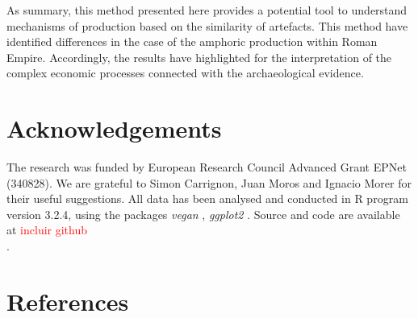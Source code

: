 \documentclass[review]{elsarticle}
\newcommand{\memo}[2]{\textcolor{#1}{#2}}
\newcommand{\maria}[1]{\memo{red}{#1\\}}
\begin{document}
As summary, this method presented here provides a potential tool to understand mechanisms of production based on the similarity of artefacts. This method have identified differences in the case of the amphoric production within Roman Empire. Accordingly, the results have highlighted for the interpretation of the complex economic processes connected with the archaeological evidence. 



\section{Acknowledgements}
The research was funded by European Research Council Advanced Grant EPNet (340828). We are grateful to Simon Carrignon, Juan Moros and Ignacio Morer for their useful suggestions.  
All data has been analysed and conducted in R program version 3.2.4, using the packages \textit{vegan} \citep{oksanen_vegan_2007}, \textit{ggplot2} \citep{ggplot2:_2016}. Source and code are available at \maria{incluir github}. 


\section{References}

%

\end{document}
